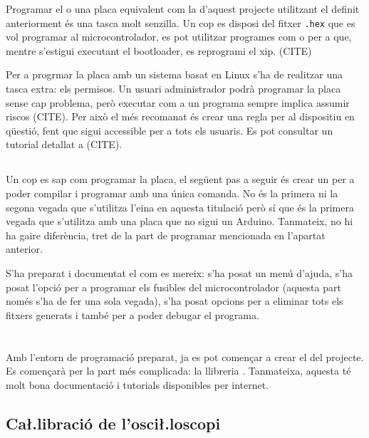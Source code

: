Programar el  o una placa equivalent com la d'aquest projecte
utilitzant el  definit anteriorment és una tasca molt senzilla.
Un cop es disposi del fitxer \verb|.hex| que es vol programar al
microcontrolador, es pot utilitzar programes com  o
 per a que, mentre s'estigui executant el bootloader, es 
reprogrami el xip. (CITE)

Per a progrmar la placa amb un sistema basat en Linux s'ha de realitzar una
tasca extra: els permisos. Un usuari administrador podrà programar la placa
sense cap problema, però executar com a  un programa sempre implica
assumir riscos (CITE). Per això el més recomanat és crear una regla 
per al dispositiu en qüestió, fent que sigui accessible per a tots els usuaris.
Es pot consultar un tutorial detallat a (CITE).

\subsection{}

Un cop es sap com programar la placa, el següent pas a seguir és crear un
 per a poder compilar i programar amb una única comanda.
No és la primera ni la segona vegada que s'utilitza l'eina  en
aquesta titulació però sí que és la primera vegada que s'utilitza amb una placa
que no sigui un Arduino. Tanmateix, no hi ha gaire diferència, tret de la
part de programar mencionada en l'apartat anterior.

S'ha preparat i documentat el  com es mereix: s'ha posat un menú
d'ajuda, s'ha posat l'opció per a programar els fusibles del microcontrolador
(aquesta part només s'ha de fer una sola vegada), s'ha posat opcions per a
eliminar tots els fitxers generats i també per a poder debugar el programa.

\section{}

Amb l'entorn de programació preparat, ja es pot començar a crear el
 del projecte. Es començarà per la part més complicada: la
llibreria . Tanmateixa, aquesta té molt bona documentació i
tutorials disponibles per internet.

\subsection{Ca\l.libració de l'osci\l.loscopi}

